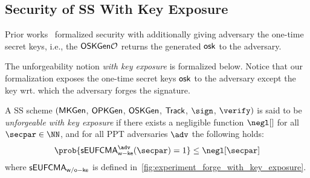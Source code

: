 \subsection{Security of SS With Key Exposure}

Prior works~\cite{EUROSP:LYWNW19, ESORICS:LLNYY20} formalized security with additionally giving adversary the one-time secret keys, i.e., the $\mathsf{OSKGen}\mathcal{O}$ returns the generated $\mathsf{osk}$ to the adversary. 

The unforgeability notion \emph{with key exposure} is formalized below. Notice that our formalization exposes  the one-time secret keys $\mathsf{osk}$ to the adversary except the key wrt. which the adversary forges the signature.

\begin{definition}
A SS scheme $(\mathsf{MKGen}$, $\mathsf{OPKGen}$, $\mathsf{OSKGen}$, $\mathsf{Track}$, $\sign$, $\verify)$ is said to be \emph{unforgeable with key exposure} if there exists a negligible function $\negl[]$ for all $\secpar \in \NN$, and for all PPT adversaries $\adv$ the following holds:
\[ \prob{\seufcmawke^\adv (\secpar)=1} \le \negl[\secpar]\]
where $\mathsf{sEUFCMA}_\mathsf{w/o-ke}$ is defined in~\cref{fig:experiment_forge_with_key_exposure}.
\end{definition}

